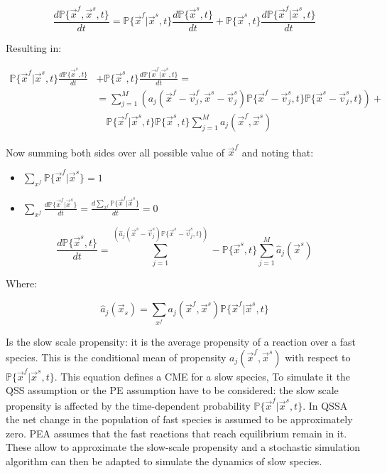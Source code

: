  $$\frac{d\mathbb{P}\{\vec{x}^f,\vec{x}^s, t\}}{dt} = \mathbb{P}\{\vec{x}^f|\vec{x}^s, t\}\frac{d\mathbb{P}\{\vec{x}^s,t\}}{dt} + \mathbb{P}\{\vec{x}^s,t\}\frac{d\mathbb{P}\{\vec{x}^f|\vec{x}^s,t\}}{dt}$$

  Resulting in:

  \begin{align*}
    \mathbb{P}\{\vec{x}^f|\vec{x}^s, t\}\frac{d\mathbb{P}\{\vec{x}^s,t\}}{dt} &+ \mathbb{P}\{\vec{x}^s,t\}\frac{d\mathbb{P}\{\vec{x}^f|\vec{x}^s,t\}}{dt} = \\
                                                                              &= \sum\limits_{j=1}^M(a_j(\vec{x}^f-\vec{v}_j^f, \vec{x}^s-\vec{v}_j^s)\mathbb{P}\{\vec{x}^f-\vec{v}_j^s,t\}\mathbb{P}\{\vec{x}^s-\vec{v}_j^s,t\})+\\
                                                                              &\quad\mathbb{P}\{\vec{x}^f|\vec{x}^s,t\}\mathbb{P}\{\vec{x}^s,t\}\sum\limits_{j=1}^Ma_j(\vec{x}^f,\vec{x}^s)
  \end{align*}

  Now summing both sides over all possible value of $\vec{x}^f$ and noting that:

  \begin{itemize}
    \item $\sum\limits_{x^f}\mathbb{P}\{\vec{x}^f|\vec{x}^s\} = 1$\;
    \item $\sum\limits_{x^f}\frac{d\mathbb{P}\{\vec{x}^f|\vec{x}^s\}}{dt} = \frac{d\sum\limits_{x^f}\mathbb{P}\{\vec{x}^f|\vec{x}^s\}}{dt}=0$\;
  \end{itemize}

  $$\frac{d\mathbb{P}\{\vec{x}^s,t\}}{dt} = \sum\limits_{j=1}^(\hat{a}_j(\vec{x}^s-\vec{v}_j^s)\mathbb{P}\{\vec{x}^s-\vec{v}_j^s, t\})-\mathbb{P}\{\vec{x}^s,t\}\sum\limits_{j=1}^M\hat{a}_j(\vec{x}^s)$$

  Where:

  $$\hat{a}_j(\vec{x}_s) = \sum\limits_{x^f}a_j(\vec{x}^f,\vec{x}^s)\mathbb{P}\{\vec{x}^f|\vec{x}^s,t\}$$

  Is the slow scale propensity: it is the average propensity of a reaction over a fast species.
  This is the conditional mean of propensity $a_j(\vec{x}^f, \vec{x}^s)$ with respect to $\mathbb{P}\{\vec{x}^f|\vec{x}^s,t\}$.
  This equation defines a CME for a slow species,
  To simulate it the QSS assumption or the PE assumption have to be considered: the slow scale propensity is affected by the time-dependent probability $\mathbb{P}\{\vec{x}^f|\vec{x}^s,t\}$.
  In QSSA the net change in the population of fast species is assumed to be approximately zero.
  PEA assumes that the fast reactions that reach equilibrium remain in it.
  These allow to approximate the slow-scale propensity and a stochastic simulation algorithm can then be adapted to simulate the dynamics of slow species.

